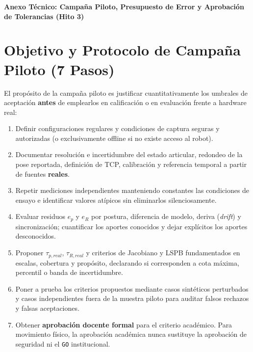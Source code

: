\documentclass[10.5pt, a4paper]{article}
\begin{document}
\begin{center}
    \Large\textbf{\textcolor{ucbblue}{Anexo Técnico: Campaña Piloto, Presupuesto de Error y Aprobación de Tolerancias (Hito 3)}}
\end{center}

\section{Objetivo y Protocolo de Campaña Piloto (7 Pasos)}
El propósito de la campaña piloto es justificar cuantitativamente los umbrales de aceptación \textbf{antes} de emplearlos en calificación o en evaluación frente a hardware real:
\begin{enumerate}[leftmargin=*, itemsep=2pt]
    \item Definir configuraciones regulares y condiciones de captura seguras y autorizadas (o exclusivamente offline si no existe acceso al robot).
    \item Documentar resolución e incertidumbre del estado articular, redondeo de la pose reportada, definición de TCP, calibración y referencia temporal a partir de fuentes \textbf{reales}.
    \item Repetir mediciones independientes manteniendo constantes las condiciones de ensayo e identificar valores atípicos sin eliminarlos silenciosamente.
    \item Evaluar residuos $e_p$ y $e_R$ por postura, diferencia de modelo, deriva (\textit{drift}) y sincronización; cuantificar los aportes conocidos y dejar explícitos los aportes desconocidos.
    \item Proponer $\tau_{p,real}$, $\tau_{R,real}$ y criterios de Jacobiano y LSPB fundamentados en escalas, cobertura y propósito, declarando si corresponden a cota máxima, percentil o banda de incertidumbre.
    \item Poner a prueba los criterios propuestos mediante casos sintéticos perturbados y casos independientes fuera de la muestra piloto para auditar falsos rechazos y falsas aceptaciones.
    \item Obtener \textbf{aprobación docente formal} para el criterio académico. Para movimiento físico, la aprobación académica nunca sustituye la aprobación de seguridad ni el \texttt{GO} institucional.
\end{enumerate}
\end{document}
